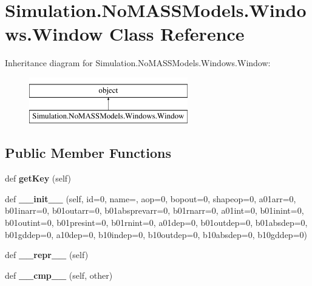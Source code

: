 \hypertarget{class_c_simulation_1_1_simulation_1_1_no_m_a_s_s_models_1_1_windows_1_1_window}{}\section{Simulation.\+No\+M\+A\+S\+S\+Models.\+Windows.\+Window Class Reference}
\label{class_c_simulation_1_1_simulation_1_1_no_m_a_s_s_models_1_1_windows_1_1_window}
Inheritance diagram for Simulation.\+No\+M\+A\+S\+S\+Models.\+Windows.\+Window\+:\begin{figure}[H]
\begin{center}
\leavevmode
\includegraphics[height=2.000000cm]{class_c_simulation_1_1_simulation_1_1_no_m_a_s_s_models_1_1_windows_1_1_window}
\end{center}
\end{figure}
\subsection*{Public Member Functions}
\begin{DoxyCompactItemize}
\item 
\mbox{\label{class_c_simulation_1_1_simulation_1_1_no_m_a_s_s_models_1_1_windows_1_1_window_a005f8f2d5acfee7d24d1aac6005a1e0a}} 
def {\bfseries get\+Key} (self)
\item 
\mbox{\label{class_c_simulation_1_1_simulation_1_1_no_m_a_s_s_models_1_1_windows_1_1_window_acce7a06489663d7d0aa8e7cc572206b9}} 
def {\bfseries \+\_\+\+\_\+init\+\_\+\+\_\+} (self, id=0, name=\textquotesingle{}\textquotesingle{}, aop=0, bopout=0, shapeop=0, a01arr=0, b01inarr=0, b01outarr=0, b01absprevarr=0, b01rnarr=0, a01int=0, b01inint=0, b01outint=0, b01presint=0, b01rnint=0, a01dep=0, b01outdep=0, b01absdep=0, b01gddep=0, a10dep=0, b10indep=0, b10outdep=0, b10absdep=0, b10gddep=0)
\item 
\mbox{\label{class_c_simulation_1_1_simulation_1_1_no_m_a_s_s_models_1_1_windows_1_1_window_a9a47563093dfc5ba12274b66e368920c}} 
def {\bfseries \+\_\+\+\_\+repr\+\_\+\+\_\+} (self)
\item 
\mbox{\label{class_c_simulation_1_1_simulation_1_1_no_m_a_s_s_models_1_1_windows_1_1_window_a157f9a5d3230b5fbbcb1391575ca1662}} 
def {\bfseries \+\_\+\+\_\+cmp\+\_\+\+\_\+} (self, other)
\end{DoxyCompactItemize}
